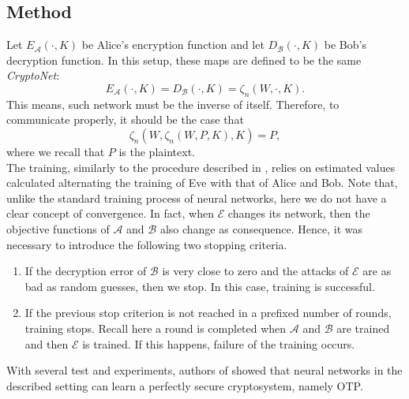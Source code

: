 \documentclass[%
    corpo=11pt,
    twoside,
    stile=classica,
    oldstyle,
    autoretitolo,
    tipotesi=magistrale,
    greek,
    evenboxes,
    english
]{toptesi}
\begin{document}
\subsection{Method}
Let $E_{\mathcal{A}}(\cdot, K)$ be Alice's encryption function and let $D_{\mathcal{B}}(\cdot, K)$ be Bob's decryption function. In this setup, these maps are defined to be the same \textit{CryptoNet}:
\begin{equation}
E_{\mathcal{A}}(\cdot, K) = D_{\mathcal{B}}(\cdot, K) = \zeta_n(W, \cdot, K).
\end{equation}
This means, such network must be the inverse of itself. Therefore, to communicate properly, it should be the case that 
\begin{equation}
\zeta_n \left(W,\zeta_n(W,P,K),K \right) = P,
\end{equation}
where we recall that $P$ is the plaintext. \\
The training, similarly to the procedure described in \cite{google}, relies on estimated values calculated alternating the training of Eve with that of Alice and Bob. Note that, unlike the standard training process of neural networks, here we do not have a clear concept of convergence. In fact, when $\mathcal{E}$ changes its network, then the objective functions of $\mathcal{A}$ and $\mathcal{B}$ also change as consequence. Hence, it was necessary to introduce the following two stopping criteria.
\begin{enumerate}
\item If the decryption error of $\mathcal{B}$ is very close to zero and the attacks of $\mathcal{E}$ are as bad as random guesses, then we stop. In this case, training is successful.
\item If the previous stop criterion is not reached in a prefixed number of rounds, training stops. Recall here a round is completed when $\mathcal{A}$ and $\mathcal{B}$ are trained and then $\mathcal{E}$ is trained. If this happens, failure of the training occurs.
\end{enumerate}
With several test and experiments, authors of \cite{brazilians} showed that neural networks in the described setting can learn a perfectly secure cryptosystem, namely OTP.
\end{document}

